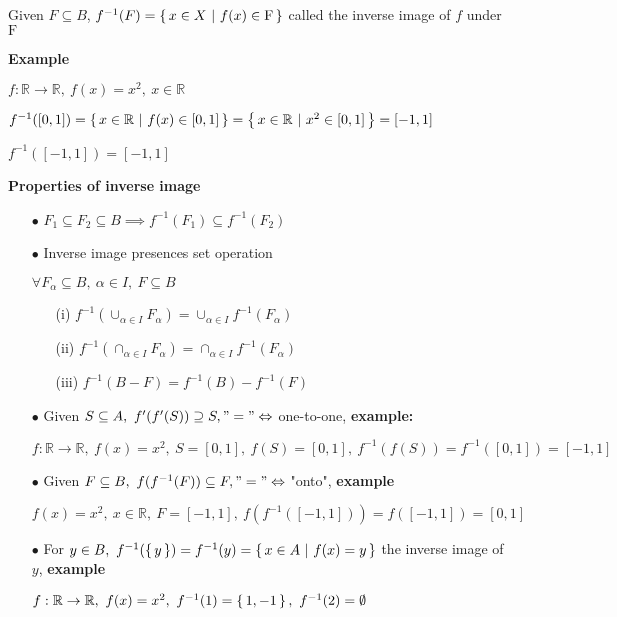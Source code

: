 Given $F \subseteq B$, $f^{-1}(F) = \left\{ \,x \in X~|~f(x) \in \mathrm F \,\right\}$ called the inverse image of $f$ under $\mathrm F$

\textbf{Example}

\begin{tcolorbox}
	$f:\mathbb R \rightarrow \mathbb R,~f(x) = x^2,~x\in \mathbb R$
	
	$f^{-1}([0,1]) = \left\{ \,x\in \mathbb R ~|~ f(x) \in [0,1] \,\right\} = \left\{ \,x \in \mathbb R ~|~ x^2 \in [0,1] \,\right\} = [-1,1]$
	
	$f^{-1}([-1,1]) = [-1,1]$
\end{tcolorbox}

\textbf{Properties of inverse image}

\begin{enumerate}
	\item[$\bullet$] $F_1 \subseteq F_2 \subseteq B \implies f^{-1}(F_1) \subseteq f^{-1}(F_2)$
	\item[$\bullet$] Inverse image presences set operation
		
		$\forall F_{\alpha} \subseteq B,~\alpha \in I,~F\subseteq B$
		\begin{enumerate}
			\item[(i)] $f^{-1}(\cup_{\alpha \in I}F_{\alpha}) = \cup_{\alpha \in I}f^{-1}(F_{\alpha})$
			\item[(ii)] $f^{-1}(\cap_{\alpha \in I}F_{\alpha}) = \cap_{\alpha \in I}f^{-1}(F_{\alpha})$
			\item[(iii)] $f^{-1}(B - F) = f^{-1}(B) - f^{-1}(F) $
		\end{enumerate}
	\item[$\bullet$] Given $S \subseteq A,~f'(f'(S)) \supseteq S, "=" \Leftrightarrow$ one-to-one, \textbf{example:}
	
	$f:\mathbb R \rightarrow \mathbb R,~f(x) = x^2,~S=[0,1],~f(S) = [0,1],~f^{-1}(f(S)) = f^{-1}([0,1]) = [-1,1]$
	
	\item[$\bullet$] Given $F \subseteq B,~f(f^{-1}(F)) \subseteq F, "=" \Leftrightarrow$ "onto", \textbf{example}
	
	$f(x) = x^2,~x \in \mathbb R,~F = [-1,1],~f(f^{-1}([-1,1])) = f([-1,1]) = [0,1]$
	
	\item[$\bullet$] For $y \in B,~f^{-1}(\left\{ \,y \,\right\}) = f^{-1}(y) = \left\{ \,x \in A ~|~ f(x) = y \,\right\}$ the inverse image of $y$, \textbf{example}
	
	$f:\mathbb R \rightarrow \mathbb R,~f(x) = x^2,~f^{-1}(1) = \left\{ \,1,-1 \,\right\},~f^{-1}(2) = \emptyset$
\end{enumerate}

